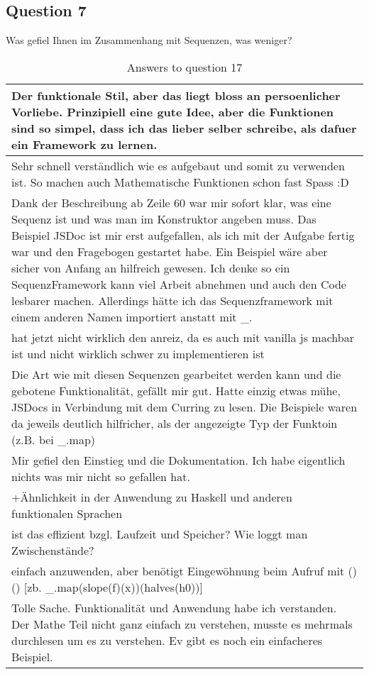 \subsection*{Question 7}
\label{sub:ut_q7}
Was gefiel Ihnen im Zusammenhang mit Sequenzen, was weniger?
\begin{table}[H]
  \centering
  \begin{tabularx}{\textwidth}{| X |} \hline
   Der funktionale Stil, aber das liegt bloss an persoenlicher Vorliebe. Prinzipiell eine gute Idee, aber die Funktionen sind so simpel, dass ich das lieber selber schreibe, als dafuer ein Framework zu lernen. \\ \hline 
   Sehr schnell verständlich wie es aufgebaut und somit zu verwenden ist. So machen auch Mathematische Funktionen schon fast Spass :D \\ \hline 
   Dank der Beschreibung ab Zeile 60 war mir sofort klar, was eine Sequenz ist und was man im Konstruktor angeben muss. Das Beispiel JSDoc ist mir erst aufgefallen, als ich mit der Aufgabe fertig war und den Fragebogen gestartet habe. Ein Beispiel wäre aber sicher von Anfang an hilfreich gewesen. Ich denke so ein SequenzFramework kann viel Arbeit abnehmen und auch den Code lesbarer machen. Allerdings hätte ich das Sequenzframework mit einem anderen Namen importiert anstatt mit \_. \\ \hline
   hat jetzt nicht wirklich den anreiz, da es auch mit vanilla js machbar ist und nicht wirklich schwer zu implementieren ist \\ \hline 
   Die Art wie mit diesen Sequenzen gearbeitet werden kann und die gebotene Funktionalität, gefällt mir gut. Hatte einzig etwas mühe, JSDocs in Verbindung mit dem Curring zu lesen. Die Beispiele waren da jeweils deutlich hilfricher, als der angezeigte Typ der Funktoin (z.B. bei \_.map) \\ \hline 
   Mir gefiel den Einstieg und die Dokumentation. Ich habe eigentlich nichts was mir nicht so gefallen hat. \\ \hline 
   +Ähnlichkeit in der Anwendung zu Haskell und anderen funktionalen Sprachen \\ \hline 
   ist das effizient bzgl. Laufzeit und Speicher? Wie loggt man Zwischenstände? \\ \hline 
   einfach anzuwenden, aber benötigt Eingewöhnung beim Aufruf mit ()() [zb. \_.map(slope(f)(x))(halves(h0))] \\ \hline 
   Tolle Sache. Funktionalität und Anwendung habe ich verstanden. Der Mathe Teil nicht ganz einfach zu verstehen, musste es mehrmals durchlesen um es zu verstehen. Ev gibt es noch ein einfacheres Beispiel. \\ \hline 
  \end{tabularx}
  \caption{Answers to question 17}
  \label{tab:app_usertest_q17}
\end{table}


